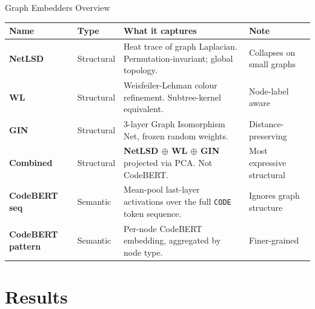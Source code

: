 \documentclass[aspectratio=169,10pt]{beamer}
\begin{document}
\begin{frame}{Graph Embedders Overview}
\vspace{0.2em}
\centering
{\small
\renewcommand{\arraystretch}{1.3}
\begin{tabular}{llp{5.8cm}l}
  \toprule
  \textbf{Name} & \textbf{Type} & \textbf{What it captures} & \textbf{Note} \\
  \midrule
  \textbf{NetLSD}   & Structural & Heat trace of graph Laplacian. Permutation-invariant; global topology. & Collapses on small graphs \\
  \textbf{WL}       & Structural & Weisfeiler-Lehman colour refinement. Subtree-kernel equivalent. & Node-label aware \\
  \textbf{GIN}      & Structural & 3-layer Graph Isomorphism Net, frozen random weights. & Distance-preserving \\
  \rowcolor{c1!10}
  \textbf{Combined} & Structural & \textbf{NetLSD $\oplus$ WL $\oplus$ GIN} projected via PCA. Not CodeBERT. & Most expressive structural \\
  \textbf{CodeBERT seq}     & Semantic & Mean-pool last-layer activations over the full \texttt{CODE} token sequence. & Ignores graph structure \\
  \textbf{CodeBERT pattern} & Semantic & Per-node CodeBERT embedding, aggregated by node type. & Finer-grained \\
  \bottomrule
\end{tabular}}

\end{frame}

\section{Results}
\end{document}
